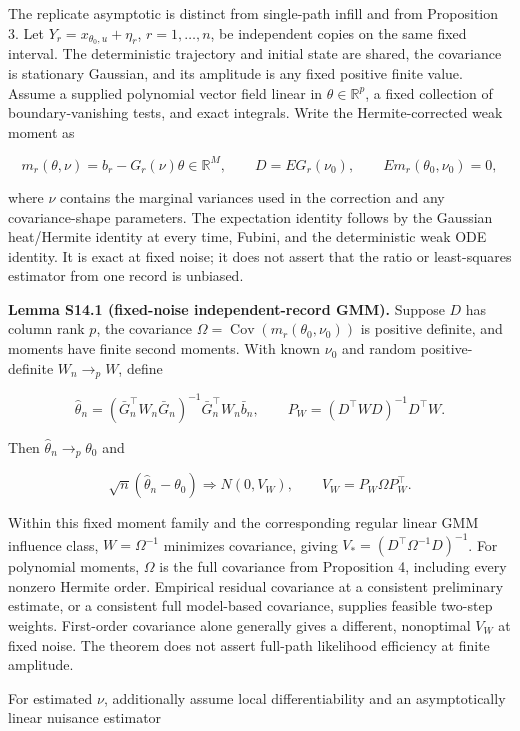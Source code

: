 \documentclass[
  american,
  11pt,
]{article}
\begin{document}
The replicate asymptotic is distinct from single-path infill and from
Proposition 3. Let \(Y_r=x_{\theta_0,u}+\eta_r\), \(r=1,\ldots,n\), be
independent copies on the same fixed interval. The deterministic
trajectory and initial state are shared, the covariance is stationary
Gaussian, and its amplitude is any fixed positive finite value. Assume a
supplied polynomial vector field linear in \(\theta\in\mathbb R^p\), a
fixed collection of boundary-vanishing tests, and exact integrals. Write
the Hermite-corrected weak moment as

\[
m_r(\theta,\nu)=b_r-G_r(\nu)\theta\in\mathbb R^M,
\qquad D=E G_r(\nu_0),\qquad E m_r(\theta_0,\nu_0)=0,
\]

where \(\nu\) contains the marginal variances used in the correction and
any covariance-shape parameters. The expectation identity follows by the
Gaussian heat/Hermite identity at every time, Fubini, and the
deterministic weak ODE identity. It is exact at fixed noise; it does not
assert that the ratio or least-squares estimator from one record is
unbiased.

\textbf{Lemma S14.1 (fixed-noise independent-record GMM).} Suppose \(D\)
has column rank \(p\), the covariance
\(\Omega=\operatorname{Cov}(m_r(\theta_0,\nu_0))\) is positive definite,
and moments have finite second moments. With known \(\nu_0\) and random
positive-definite \(W_n\to_p W\), define

\[
\widehat\theta_n=(\bar G_n^\top W_n\bar G_n)^{-1}\bar G_n^\top W_n\bar b_n,
\qquad P_W=(D^\top W D)^{-1}D^\top W.
\]

Then \(\widehat\theta_n\to_p\theta_0\) and

\[
\sqrt n(\widehat\theta_n-\theta_0)\Rightarrow N(0,V_W),
\qquad V_W=P_W\Omega P_W^\top.
\]

Within this fixed moment family and the corresponding regular linear GMM
influence class, \(W=\Omega^{-1}\) minimizes covariance, giving
\(V_*=(D^\top\Omega^{-1}D)^{-1}\). For polynomial moments, \(\Omega\) is
the full covariance from Proposition 4, including every nonzero Hermite
order. Empirical residual covariance at a consistent preliminary
estimate, or a consistent full model-based covariance, supplies feasible
two-step weights. First-order covariance alone generally gives a
different, nonoptimal \(V_W\) at fixed noise. The theorem does not
assert full-path likelihood efficiency at finite amplitude.

For estimated \(\nu\), additionally assume local differentiability and
an asymptotically linear nuisance estimator
\end{document}
